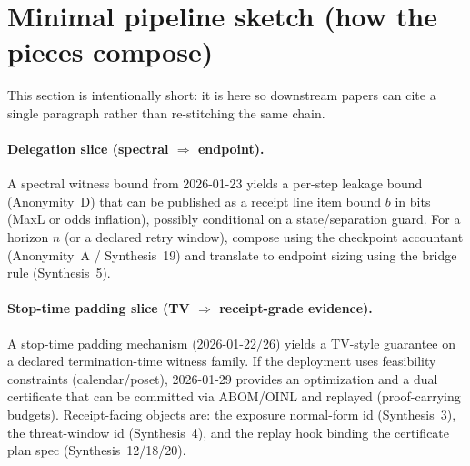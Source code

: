 \documentclass[11pt]{article}
\begin{document}
\section{Minimal pipeline sketch (how the pieces compose)}
This section is intentionally short: it is here so downstream papers can cite a single paragraph rather than re-stitching the same chain.

\paragraph{Delegation slice (spectral $\Rightarrow$ endpoint).}
A spectral witness bound from 2026-01-23 yields a per-step leakage bound (Anonymity~D) that can be published as a receipt line item bound $b$ in bits (MaxL or odds inflation), possibly conditional on a state/separation guard.
For a horizon $n$ (or a declared retry window), compose using the checkpoint accountant (Anonymity~A / Synthesis~19) and translate to endpoint sizing using the bridge rule (Synthesis~5).\cite{series:spectral2budget,series:oddsinflation,series:receiptacct,series:endpointbridge}

\paragraph{Stop-time padding slice (TV $\Rightarrow$ receipt-grade evidence).}
A stop-time padding mechanism (2026-01-22/26) yields a TV-style guarantee on a declared termination-time witness family.
If the deployment uses feasibility constraints (calendar/poset), 2026-01-29 provides an optimization and a dual certificate that can be committed via ABOM/OINL and replayed (proof-carrying budgets).
Receipt-facing objects are: the exposure normal-form id (Synthesis~3), the threat-window id (Synthesis~4), and the replay hook binding the certificate plan spec (Synthesis~12/18/20).\cite{series:traceifaces,series:threatwindows,series:receiptitems,series:planstateequiv,series:auditorreplay,wiki:scheduling,wiki:stopadd,wiki:knapsack}
\end{document}
